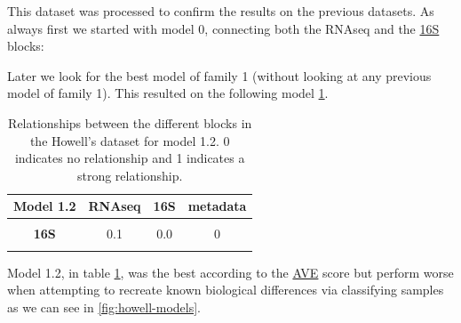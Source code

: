 \documentclass[
  12pt,
  a4paper,
  twoside,
  openright]{book}
\begin{document}
This dataset was processed to confirm the results on the previous datasets.
As always first we started with model 0, connecting both the RNAseq and the \protect\hyperlink{acronyms_16S}{16S} blocks:

Later we look for the best model of family 1 (without looking at any previous model of family 1).
This resulted on the following model \ref{tab:howell-model1-2}.

\begin{table}[H]

\caption[Model 1.2 of the Howell's dataset.]{\label{tab:howell-model1-2}Relationships between the different blocks in the Howell's dataset for model 1.2. 0 indicates no relationship and 1 indicates a strong relationship.}
\centering
\begin{tabular}[t]{>{}c|c|c|c}
\hline
\textbf{Model 1.2} & \textbf{RNAseq} & \textbf{16S} & \textbf{metadata}\\
\hline
\textbf{\cellcolor{gray!6}{RNAseq}} & \cellcolor{gray!6}{0.0} & \cellcolor{gray!6}{0.1} & \cellcolor{gray!6}{1}\\
\hline
\textbf{16S} & 0.1 & 0.0 & 0\\
\hline
\textbf{\cellcolor{gray!6}{metadata}} & \cellcolor{gray!6}{1.0} & \cellcolor{gray!6}{0.0} & \cellcolor{gray!6}{0}\\
\hline
\end{tabular}
\end{table}

Model 1.2, in table \ref{tab:howell-model1-2}, was the best according to the \protect\hyperlink{acronyms_AVE}{AVE} score but perform worse when attempting to recreate known biological differences via classifying samples as we can see in \ref{fig:howell-models}.
\end{document}
